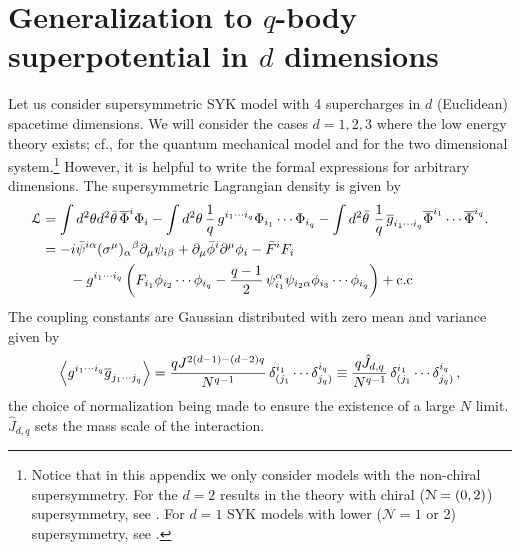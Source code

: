 \documentclass[11pt]{article}
\newcommand{\thetab}{\bar{\theta}}
\newcommand{\psib}{\bar{\psi}}
\newcommand{\Phib}{\overline{\Phi}}
\newcommand{\phib}{\bar{\phi}}
\newcommand{\Fb}{\bar{F}}
\begin{document}
\section{Generalization to \texorpdfstring{$q$}{q}-body superpotential in \texorpdfstring{$d$}{d} dimensions}
\label{sec:genqd}

Let us consider supersymmetric SYK model with 4 supercharges in $d$ (Euclidean) spacetime dimensions. We will consider the cases $d=1,2,3$ where the low energy theory exists; cf., \cite{Anninos:2016szt,Gates:2021jdm} for the quantum mechanical model and \cite{Murugan:2017eto} for the two dimensional system.\footnote{Notice that in this appendix we only consider models with the non-chiral supersymmetry. For the $d=2$ results in the theory with chiral (${\cal N}=(0,2)$) supersymmetry, see \cite{Peng:2018zap}. For $d=1$ SYK models with lower ($\mathcal{N}=1$ or 2) supersymmetry, see \cite{Fu:2016vas}.}
However,  it is helpful to write the formal expressions for arbitrary dimensions. The supersymmetric Lagrangian density is given by 
%
\begin{equation}\label{eq:susyLdq}
\begin{split}
{\cal L}
&=
	\int d^2\theta d^2\thetab \,\Phib^i\Phi_i - \int d^2\theta \, 
	\frac{1}{q} \, g^{i_1\cdots i_q }\Phi_{i_1}\cdots\Phi_{i_q} -\int d^2\thetab \ \frac{1}{q} \,\overline{g}_{i_1\cdots i_q} \Phib^{i_1}\cdots \Phib^{i_q}. \\
& =
	-i \psib^{i \alpha}(\sigma^\mu)_\alpha{}^\beta \partial_\mu\psi_{i \beta} 
	+\partial_\mu \phib^i\partial^\mu\phi_i -\Fb^i F_i
\\
&\qquad 
-g^{i_1\cdots i_q}\left(F_{i_1}\phi_{i_2}\cdots \phi_{i_q}- \frac{q-1}{2}\, \psi_{i_1}^\alpha \psi_{i_2 \alpha} \phi_{i_3}\cdots \phi_{i_q}\right) + \text{c.c}
\end{split}
\end{equation}	
%
The coupling constants are  Gaussian distributed with zero mean and variance given by 
%
\begin{equation}
\expval{ g^{i_1\cdots i_q}\overline g_{j_1\cdots j_q}}
=  \frac{qJ^{2(d-1)-(d-2)q}}{ N^{q-1}}  \,\delta^{i_1}_{(j_1}\cdots\delta^{i_q}_{j_q)}
\equiv   \frac{q\hat{J}_{d,q}}{N^{q-1}}\,\delta^{i_1}_{(j_1}\cdots\delta^{i_q}_{j_q)}\,,
\end{equation}	
%
the choice of normalization being made to ensure  the existence of a large $N$ limit. $\hat{J}_{d,q}$ sets the mass scale of the interaction.
\end{document}
